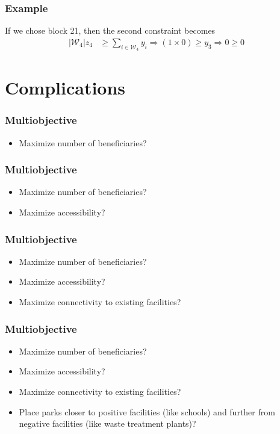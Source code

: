\documentclass[10pt, compress]{beamer}
\begin{document}
\begin{frame}[fragile]
  \frametitle{Example}
  \begin{center}
\end{center}
If we chose block 21, then the second constraint becomes \newline
\begin{align*}
\left|\mathcal{W}_4\right|z_4&\geq \sum_{i \in \mathcal{W}_4} y_i 
\Rightarrow (1 \times 0) \geq y_3 
\Rightarrow 0 \geq 0
\end{align*}
\end{frame}

\section{Complications}

\begin{frame}[fragile]
\frametitle{Multiobjective}
\begin{itemize}
\item Maximize number of beneficiaries?
\end{itemize}
\end{frame}

\begin{frame}[fragile]
\frametitle{Multiobjective}
\begin{itemize}
\item Maximize number of beneficiaries?
\item Maximize accessibility?
\end{itemize}
\end{frame}

\begin{frame}[fragile]
\frametitle{Multiobjective}
\begin{itemize}
\item Maximize number of beneficiaries?
\item Maximize accessibility?
\item Maximize connectivity to existing facilities?
\end{itemize}
\end{frame}

\begin{frame}[fragile]
\frametitle{Multiobjective}
\begin{itemize}
\item Maximize number of beneficiaries?
\item Maximize accessibility?
\item Maximize connectivity to existing facilities?
\item Place parks closer to positive facilities (like schools) and further from negative facilities (like waste treatment plants)?
\end{itemize}
\end{frame}
\end{document}
